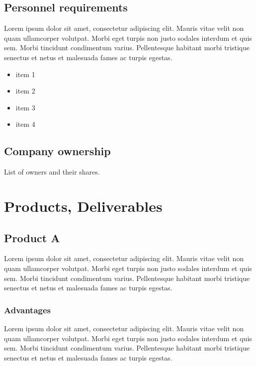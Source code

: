 \documentclass[11pt,titlepage]{article}
\begin{document}
\subsection{Personnel requirements}
Lorem ipsum dolor sit amet, consectetur adipiscing elit. Mauris vitae velit 
non quam ullamcorper volutpat. Morbi eget turpis non justo sodales interdum 
et quis sem. Morbi tincidunt condimentum varius. Pellentesque habitant morbi 
tristique senectus et netus et malesuada fames ac turpis egestas.\newline
\begin{itemize}
\item item 1
\item item 2
\item item 3
\item item 4
\end{itemize}

\subsection{Company ownership}
List of owners and their shares.
\pagebreak

\section{Products, Deliverables}
\subsection{Product A}
Lorem ipsum dolor sit amet, consectetur adipiscing elit. Mauris vitae velit 
non quam ullamcorper volutpat. Morbi eget turpis non justo sodales interdum 
et quis sem. Morbi tincidunt condimentum varius. Pellentesque habitant morbi 
tristique senectus et netus et malesuada fames ac turpis egestas.\newline

\subsubsection{Advantages}
Lorem ipsum dolor sit amet, consectetur adipiscing elit. Mauris vitae velit 
non quam ullamcorper volutpat. Morbi eget turpis non justo sodales interdum 
et quis sem. Morbi tincidunt condimentum varius. Pellentesque habitant morbi 
tristique senectus et netus et malesuada fames ac turpis egestas.\newline
\end{document}
